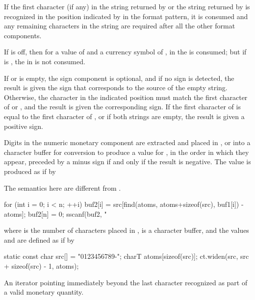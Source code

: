 \begin{itemdescr}
\pnum
If the first character (if any) in
the string  returned by  or
the string  returned by 
is recognized in the position indicated by  in the format pattern,
it is consumed and
any remaining characters in the string are required
after all the other format components.
\begin{example}
If  is off,
then for a  value of  and
a currency symbol of ,
in  the  is consumed;
but if  is ,
the  in  is not consumed.
\end{example}
If  or  is empty,
the sign component is optional, and
if no sign is detected,
the result is given the sign that corresponds to the source of the empty string.
Otherwise,
the character in the indicated position must match
the first character of  or ,
and the result is given the corresponding sign.
If the first character of  is equal to
the first character of ,
or if both strings are empty,
the result is given a positive sign.

\pnum
Digits in the numeric monetary component are extracted and
placed in , or into a character buffer 
for conversion to produce a value for ,
in the order in which they appear,
preceded by a minus sign if and only if the result is negative.
The value  is produced as if by
\begin{footnote}
The semantics here are different from .
\end{footnote}
\begin{codeblock}
for (int i = 0; i < n; ++i)
  buf2[i] = src[find(atoms, atoms+sizeof(src), buf1[i]) - atoms];
buf2[n] = 0;
sscanf(buf2, "%
\end{codeblock}
where  is the number of characters placed in ,
 is a character buffer, and
the values  and  are defined as if by
\begin{codeblock}
static const char src[] = "0123456789-";
charT atoms[sizeof(src)];
ct.widen(src, src + sizeof(src) - 1, atoms);
\end{codeblock}

\pnum
\returns
An iterator pointing immediately beyond
the last character recognized as part of a valid monetary quantity.
\end{itemdescr}

